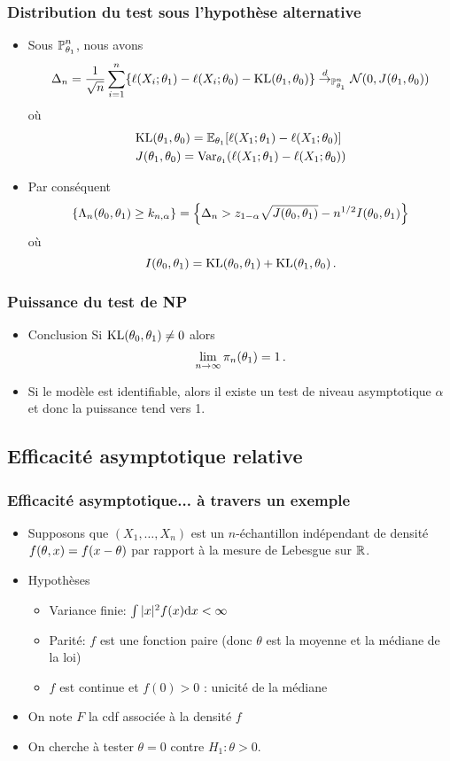 \begin{frame}
\frametitle{Distribution du test sous l'hypothèse alternative}
\begin{itemize}
\item Sous $\operatorname{{\mathbb P}}^n_{\theta_1}$, nous avons
\[
\Delta_n= \frac{1}{\sqrt{n}} \sum_{i=1}^n \{ \ell(X_i;\theta_1) -
\ell(X_i;\theta_0) - \mathrm{KL}(\theta_1,\theta_0) \}
\stackrel{d}{\rightarrow}_{\operatorname{{\mathbb P}}^n_{\theta_1}} \mathcal{N}( 0, J(\theta_1,\theta_0) )
\]
où
\begin{align*}
&\mathrm{KL}(\theta_1,\theta_0)= \operatorname{{\mathbb E}}_{\theta_1}[ \ell(X_1;\theta_1) - \ell(X_1;\theta_0)]  \\
&J(\theta_1,\theta_0) = \operatorname{\mathrm{Var}}_{\theta_1} ( \ell(X_1;\theta_1) - \ell(X_1;\theta_0) )
\end{align*}
\pause \item Par conséquent
\[
\{ \Lambda_n(\theta_0,\theta_1) \geq k_{n,\alpha} \} = \left\{ \Delta_n
  > z_{1-\alpha} \sqrt{J(\theta_0,\theta_1)} - n^{1/2}
  I(\theta_0,\theta_1) \right\}
\]
où
$$
I(\theta_0,\theta_1)= \mathrm{KL}(\theta_0,\theta_1) + \mathrm{KL}(\theta_1,\theta_0) \,.
$$
\end{itemize}
\end{frame}

\begin{frame}
\frametitle{Puissance du test de NP}
\begin{itemize}
\item \alert{Conclusion} Si $\mathrm{KL}(\theta_0,\theta_1) \ne 0$ alors
\[
\lim_{n \to \infty} \pi_n(\theta_1)= 1 \,.
\]
\item Si le modèle est identifiable, alors il existe un test de niveau asymptotique $\alpha$ et donc la puissance tend vers 1.
\end{itemize}
\end{frame}

\subsection{Efficacité asymptotique relative}
\begin{frame}
\frametitle{Efficacité asymptotique... à travers un exemple}
\begin{itemize}
\item Supposons que $(X_1,\dots,X_n)$ est un $n$-échantillon indépendant de densité $f(\theta,x)= f(x-\theta)$ par rapport à la mesure de Lebesgue sur $\mathbb{R}$.
\item \alert{Hypothèses}
\begin{itemize}
\item Variance finie: $\int |x|^2 f(x) \mathrm{d} x < \infty$
\item Parité: $f$ est une fonction paire (donc $\theta$ est la moyenne et la
  médiane de la loi)
\item $f$ est continue et $f(0) > 0$ : unicité de la médiane
\end{itemize}
\item On note $F$ la cdf associée à la densité $f$
\item On cherche à tester $\theta= 0$ contre $H_1: \theta > 0$.
\end{itemize}
\end{frame}


